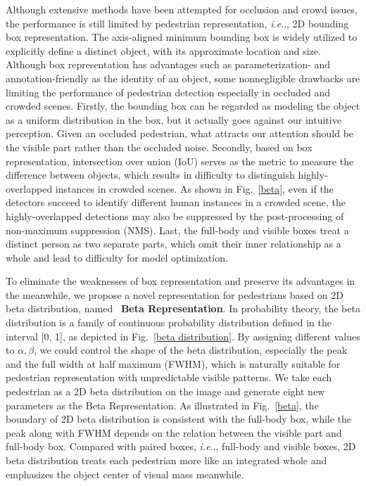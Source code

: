 \documentclass{article}
\makeatletter
\DeclareRobustCommand\onedot{\futurelet\@let@token\@onedot}
\def\@onedot{\ifx\@let@token.\else.\null\fi\xspace}
\def\ie{\emph{i.e}\onedot} \def\Ie{\emph{I.e}\onedot}
\makeatother
\begin{document}
Although extensive methods have been attempted for occlusion and crowd issues, the performance is still limited by pedestrian representation, \ie, 2D bounding box representation.
The axis-aligned minimum bounding box is widely utilized to explicitly define a distinct object, with its approximate location and size.
Although box representation has advantages such as parameterization- and annotation-friendly as the identity of an object, some nonnegligible drawbacks are limiting the performance of pedestrian detection especially in occluded and crowded scenes.
Firstly, the bounding box can be regarded as modeling the object as a uniform distribution in the box, but it actually goes against our intuitive perception. Given an occluded pedestrian, what attracts our attention should be the visible part rather than the occluded noise.
Secondly, based on box representation, intersection over union (IoU) serves as the metric to measure the difference between objects, which results in difficulty to distinguish highly-overlapped instances in crowded scenes.
As shown in Fig.~\ref{beta}, even if the detectors succeed to identify different human instances in a crowded scene, the highly-overlapped detections may also be suppressed by the post-processing of non-maximum suppression (NMS).
Last, the full-body and visible boxes treat a distinct person as two separate parts, which omit their inner relationship as a whole and lead to difficulty for model optimization. 








To eliminate the weaknesses of box representation and preserve its advantages in the meanwhile, we propose a novel representation for pedestrians based on 2D beta distribution, named ~\textbf{Beta Representation}.
In probability theory, the beta distribution is a family of continuous probability distribution defined in the interval [0, 1], as depicted in Fig.~\ref{beta distribution}.
By assigning different values to $\alpha, \beta$, we could control the shape of the beta distribution, especially the peak and the full width at half maximum (FWHM), which is naturally suitable for pedestrian representation with unpredictable visible patterns.
We take each pedestrian as a 2D beta distribution on the image and generate eight new parameters as the Beta Representation.
As illustrated in Fig.~\ref{beta}, the boundary of 2D beta distribution is consistent with the full-body box, while the peak along with FWHM depends on the relation between the visible part and full-body box.
Compared with paired boxes, \ie, full-body and visible boxes, 2D beta distribution treats each pedestrian more like an integrated whole and emphasizes the object center of visual mass meanwhile.
\end{document}
